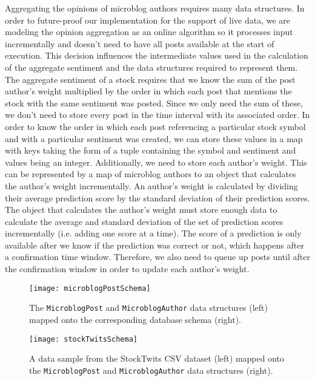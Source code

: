 Aggregating the opinions of microblog authors requires many data structures. In order to future-proof our implementation for the support of live data, we are modeling the opinion aggregation as an online algorithm so it processes input incrementally and doesn't need to have all posts available at the start of execution. This decision influences the intermediate values used in the calculation of the aggregate sentiment and the data structures required to represent them. The aggregate sentiment of a stock requires that we know the sum of the post author's weight multiplied by the order in which each post that mentions the stock with the same sentiment was posted. Since we only need the sum of these, we don't need to store every post in the time interval with its associated order. In order to know the order in which each post referencing a particular stock symbol and with a particular sentiment was created, we can store these values in a map with keys taking the form of a tuple containing the symbol and sentiment and values being an integer. Additionally, we need to store each author's weight. This can be represented by a map of microblog authors to an object that calculates the author's weight incrementally. An author's weight is calculated by dividing their average prediction score by the standard deviation of their prediction scores. The object that calculates the author's weight must store enough data to calculate the average and standard deviation of the set of prediction scores incrementally (i.e. adding one score at a time). The score of a prediction is only available after we know if the prediction was correct or not, which happens after a confirmation time window. Therefore, we also need to queue up posts until after the confirmation window in order to update each author's weight.

\begin{figure}[h]
  \label{microblogPostSchema}
  \begin{center}
    \texttt{[image: microblogPostSchema]}
  \end{center}
  \caption{The \texttt{MicroblogPost} and \texttt{MicroblogAuthor} data structures (left) mapped onto the corresponding database schema (right).}
\end{figure}
\begin{figure}[h]
  \label{stockTwitsSchema}
  \begin{center}
    \texttt{[image: stockTwitsSchema]}
  \end{center}
  \caption{A data sample from the StockTwits CSV dataset (left) mapped onto the \texttt{MicroblogPost} and \texttt{MicroblogAuthor} data structures (right).}
\end{figure}

